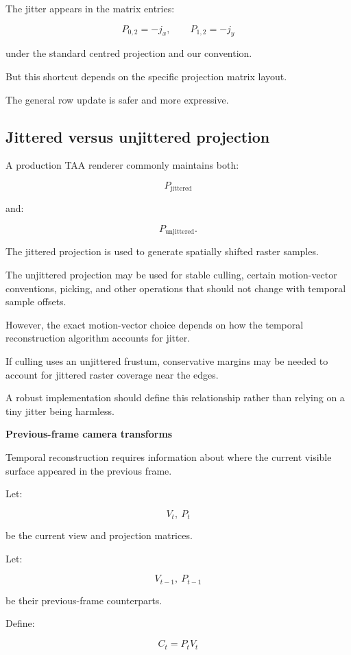 The jitter appears in the matrix entries:

\[
 \boxed{ P_{0,2}=-j_x, \qquad P_{1,2}=-j_y }
\]

under the standard centred projection and our convention.

But this shortcut depends on the specific projection matrix layout.

The general row update is safer and more expressive.

\subsection{Jittered versus unjittered projection}\label{02-foundations-ii-ch036-jittered-versus-unjittered-projection}

A production TAA renderer commonly maintains both:

\[
 P_{\mathrm{jittered}}
\]

and:

\[
 P_{\mathrm{unjittered}}.
\]

The jittered projection is used to generate spatially shifted raster samples.

The unjittered projection may be used for stable culling, certain motion-vector conventions, picking, and other operations that should not change with temporal sample offsets.

However, the exact motion-vector choice depends on how the temporal reconstruction algorithm accounts for jitter.

If culling uses an unjittered frustum, conservative margins may be needed to account for jittered raster coverage near the edges.

A robust implementation should define this relationship rather than relying on a tiny jitter being harmless.

\textbf{Previous-frame camera transforms}

Temporal reconstruction requires information about where the current visible surface appeared in the previous frame.

Let:

\[
 V_t,\ P_t
\]

be the current view and projection matrices.

Let:

\[
 V_{t-1},\ P_{t-1}
\]

be their previous-frame counterparts.

Define:

\[
 \boxed{ C_t=P_tV_t }
\]

